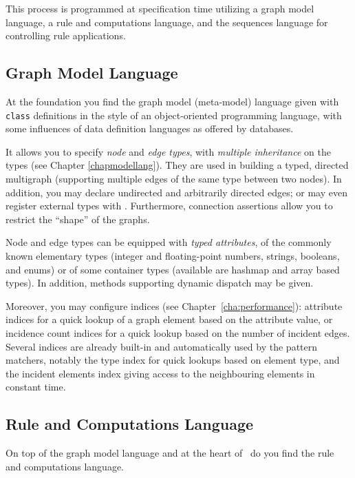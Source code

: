 This process is programmed at specification time utilizing a graph model language, a rule and computations language, and the sequences language for controlling rule applications.

\subsection{Graph Model Language}
At the foundation you find the graph model (meta-model) language given with \texttt{class} definitions in the style of an object-oriented programming language, with some influences of data definition languages as offered by databases. 

It allows you to specify \emph{node} and \emph{edge types}, with \emph{multiple inheritance} on the types (see Chapter \ref{chapmodellang}).
They are used in building a typed, directed multigraph (supporting multiple edges of the same type between two nodes).
In addition, you may declare undirected and arbitrarily directed edges; or may even register external types with \GrG.
Furthermore, connection assertions allow you to restrict the ``shape'' of the graphs.

Node and edge types can be equipped with \emph{typed attributes}, of the commonly known elementary types (integer and floating-point numbers, strings, booleans, and enums) or of some container types (available are hashmap and array based types).
In addition, methods supporting dynamic dispatch may be given.%

Moreover, you may configure indices (see Chapter~\ref{cha:performance}): attribute indices for a quick lookup of a graph element based on the attribute value, or incidence count indices for a quick lookup based on the number of incident edges.
Several indices are already built-in and automatically used by the pattern matchers, notably the type index for quick lookups based on element type, and the incident elements index giving access to the neighbouring elements in constant time.

\subsection{Rule and Computations Language}
On top of the graph model language and at the heart of \GrG\ do you find the rule and computations language.

